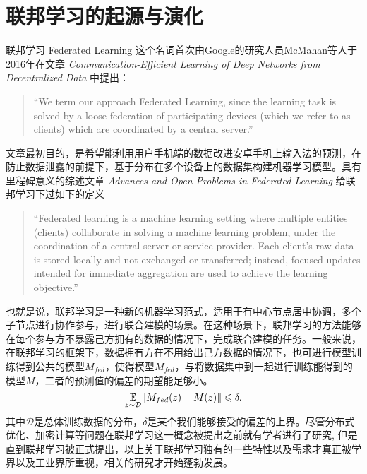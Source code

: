 \section{联邦学习的起源与演化}
\label{sec:fl_origin}

联邦学习 Federated Learning 这个名词首次由Google的研究人员McMahan等人于2016年在文章 \emph{Communication-Efficient Learning of Deep Networks from Decentralized Data}\cite{mcmahan2017fed_avg} 中提出：
\begin{quote}
    ``We term our approach Federated Learning, since the learning task is solved by a loose federation of participating devices (which we refer to as clients) which are coordinated by a central server.''
\end{quote}
文章\parencite{mcmahan2017fed_avg}最初目的，是希望能利用用户手机端的数据改进安卓手机上输入法的预测，在防止数据泄露的前提下，基于分布在多个设备上的数据集构建机器学习模型。具有里程碑意义的综述文章 \emph{Advances and Open Problems in Federated Learning}\cite{kairouz2019advances_fl} 给联邦学习下过如下的定义
\begin{quote}
    ``Federated learning is a machine learning setting where multiple entities (clients) collaborate in solving a machine learning problem, under the coordination of a central server or service provider. Each client's raw data is stored locally and not exchanged or transferred; instead, focused updates intended for immediate aggregation are used to achieve the learning objective.''
\end{quote}
也就是说，联邦学习是一种新的机器学习范式，适用于有中心节点居中协调，多个子节点进行协作参与，进行联合建模的场景。在这种场景下，联邦学习的方法能够在每个参与方不暴露己方拥有的数据的情况下，完成联合建模的任务。一般来说，在联邦学习的框架下，数据拥有方在不用给出己方数据的情况下，也可进行模型训练得到公共的模型$M_{fed}$，使得模型$M_{fed}$，与将数据集中到一起进行训练能得到的模型$M$，二者的预测值的偏差的期望能足够小。
\begin{equation}
\label{eq:general-fl}
\operatorname*{\mathbb{E}}_{z\sim\mathcal{D}} \lVert M_{fed}(z) - M(z) \rVert \leqslant \delta.
\end{equation}
其中$\mathcal{D}$是总体训练数据的分布，$\delta$是某个我们能够接受的偏差的上界。尽管分布式优化、加密计算等问题在联邦学习这一概念被提出之前就有学者进行了研究\cite{boyd2011distributed, dist_pca_2014_nips, Gentry_2009_FHE, Nikolaenko_2013}, 但是直到联邦学习被正式提出\cite{mcmahan2017fed_avg}，以上关于联邦学习独有的一些特性以及需求才真正被学界以及工业界所重视，相关的研究才开始蓬勃发展。

